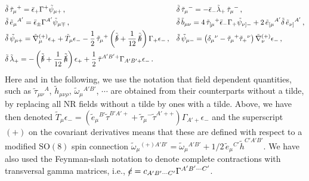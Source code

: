 \documentclass[a4paper,10pt,openany]{article}
\begin{document}
	\begin{align}
		&\tilde\delta\,\tilde\tau_\mu{}^+ = \bar\epsilon_+\Gamma^+\tilde\psi_{\mu+}\,, && \tilde\delta\,\tilde\tau_\mu{}^- = -\bar\epsilon_-\tilde\lambda_+\,\tilde\tau_\mu{}^-\,,\notag\\
		&\tilde\delta\,\tilde e_\mu{}^{A'} = \bar\epsilon_\pm\Gamma^{A'}\tilde\psi_{\mu\mp}\,,&& \tilde\delta\,\tilde b_{\mu\nu} = 4\,\tilde\tau_{[\mu}{}^+\bar\epsilon_-\Gamma_+\tilde\psi_{\nu]-} +2\,\tilde e_{[\mu}{}^{A'}\tilde\delta\,\tilde e_{\nu]}{}^{A'}\,,\notag\\
		&\tilde\delta\,\tilde\psi_{\mu+} = \tilde\nabla^{(+)}_\mu\epsilon_+ + \tilde T_\mu\epsilon_- - \frac12\,\tilde\tau_\mu{}^+\left(\tilde{\slashed b} + \frac{1}{12}\,\tilde{\slashed{h}}\right)\Gamma_+\epsilon_-\,, && \tilde\delta\,\tilde\psi_{\mu-} = \left(\delta_\mu{}^\nu - \tilde\tau_\mu{}^+\tilde\tau_+{}^\nu\right)\tilde\nabla^{(+)}_\nu\epsilon_-\,,\notag\\
		&\tilde\delta\,\tilde\lambda_+ = -\left(\tilde{\slashed b}  + \frac{1}{12}\,\tilde{\slashed h}\right)\epsilon_+ + \frac12\,\tilde\tau^{A'B'+}\Gamma_{A'B'+}\epsilon_-\,.
	\end{align}
	Here and in the following, we use the notation that field dependent quantities, such as $\tilde{\tau}_{\mu\nu}{}^A$, $\tilde{h}_{\mu\nu\rho}$, $\tilde{\omega}_\mu{}^{A'B'}$, $\cdots$ are obtained from their counterparts without a tilde, by replacing all NR fields without a tilde by ones with a tilde. Above, we have then denoted $\tilde T_\mu\epsilon_- = (\tilde e_\mu{}^{B'}\tilde\tau^{B'A'+}+\tilde\tau_\mu{}^-\tilde\tau^{A'++})\Gamma_{A'+}\epsilon_-$ and the superscript $(+)$ on the covariant derivatives means that these are defined with respect to a modified $\mathrm{SO}(8)$ spin connection $\tilde\omega_\mu{}^{(+)A'B'}=\tilde\omega_\mu{}^{A'B'} + 1/2\,\tilde e_\mu{}^{C'}\tilde h^{C'A'B'}$. We have also used the Feynman-slash notation to denote complete contractions with transversal gamma matrices, i.e., $\slashed c = c_{A'B'\cdots C'}\Gamma^{A'B'\cdots C'}$.
	
\end{document}
